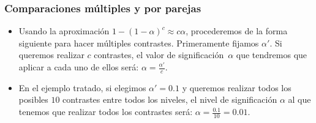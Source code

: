 \begin{frame}
\frametitle{Comparaciones múltiples y por parejas}
\begin{itemize}
\item<2-> Usando la aproximación $1-(1-\alpha)^c \approx c\alpha$, procederemos de la forma siguiente para hacer múltiples contrastes. Primeramente
fijamos $\alpha'$. Si queremos realizar $c$ contrastes, el valor de significación~$\alpha$ que tendremos que aplicar a cada uno de ellos será: $\alpha
=\frac{\alpha'}{c}$. 
\item<3-> En el ejemplo tratado, si elegimos $\alpha'=0.1$ y queremos realizar todos los posibles $10$ contrastes entre todos los niveles, el nivel de significación $\alpha$ al que tenemos que realizar todos los contrastes será: $\alpha=\frac{0.1}{10}=0.01$.
\end{itemize}
\end{frame}

